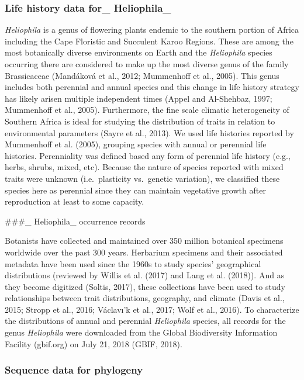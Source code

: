 \documentclass[man,floatsintext]{apa6}
\theoremstyle{definition}
\theoremstyle{definition}
\theoremstyle{definition}
\theoremstyle{remark}
\begin{document}
\hypertarget{life-history-data-for_-heliophila_}{%
\subsubsection{Life history data for\_
Heliophila\_}\label{life-history-data-for_-heliophila_}}

\emph{Heliophila} is a genus of flowering plants endemic to the southern
portion of Africa including the Cape Floristic and Succulent Karoo
Regions. These are among the most botanically diverse environments on
Earth and the \emph{Heliophila} species occurring there are considered
to make up the most diverse genus of the family Brassicaceae (Mandáková
et al., 2012; Mummenhoff et al., 2005). This genus includes both
perennial and annual species and this change in life history strategy
has likely arisen multiple independent times (Appel and Al-Shehbaz,
1997; Mummenhoff et al., 2005). Furthermore, the fine scale climatic
heterogeneity of Southern Africa is ideal for studying the distribution
of traits in relation to environmental parameters (Sayre et al., 2013).
We used life histories reported by Mummenhoff et al. (2005), grouping
species with annual or perennial life histories. Perenniality was
defined based any form of perennial life history (e.g., herbs, shrubs,
mixed, etc). Because the nature of species reported with mixed traits
were unknown (i.e.~plasticity vs.~genetic variation), we classified
these species here as perennial since they can maintain vegetative
growth after reproduction at least to some capacity.

\#\#\#\_ Heliophila\_ occurrence records

Botanists have collected and maintained over 350 million botanical
specimens worldwide over the past 300 years. Herbarium specimens and
their associated metadata have been used since the 1960s to study
species' geographical distributions (reviewed by Willis et al. (2017)
and Lang et al. (2018)). And as they become digitized (Soltis, 2017),
these collections have been used to study relationships between trait
distributions, geography, and climate (Davis et al., 2015; Stropp et
al., 2016; Václavı'k et al., 2017; Wolf et al., 2016). To characterize
the distributions of annual and perennial \emph{Heliophila} species, all
records for the genus \emph{Heliophila} were downloaded from the Global
Biodiversity Information Facility (gbif.org) on July 21, 2018 (GBIF,
2018).

\hypertarget{sequence-data-for-phylogeny}{%
\subsubsection{Sequence data for
phylogeny}\label{sequence-data-for-phylogeny}}
\end{document}
